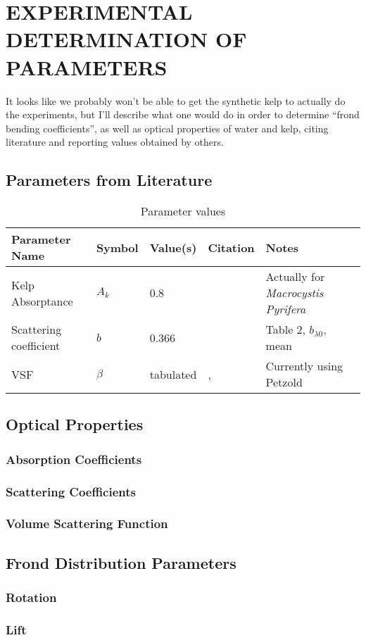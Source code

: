 \chapter{EXPERIMENTAL DETERMINATION OF PARAMETERS} \label{ch:experiment}

It looks like we probably won't be able to get the synthetic kelp to actually do
the experiments, but I'll describe what one would do in order to determine
``frond bending coefficients'', as well as optical properties of water and kelp,
citing literature and reporting values obtained by others.


\section{Parameters from Literature}
\begin{table}
  \caption{Parameter values}
  \centering
  \begin{tabular}{p{} p{} p{} p{} p{}}
    \toprule
    Parameter Name & Symbol & Value(s) & Citation & Notes \\
    \midrule
    Kelp Absorptance & $A_k$ & 0.8 & \cite{colombo-pallotta_photosynthetic_2006} & Actually for \textit{Macrocystis Pyrifera}\\
    Scattering coefficient & $b$ & 0.366 & \cite{sokolov_parameterization_2010} & Table 2, $b_{\lambda 0}$, mean \\
    VSF & $\beta$ & tabulated & \cite{petzold_volume_1972,sokolov_parameterization_2010}, & Currently using Petzold\\ 
    \bottomrule
  \end{tabular}
\end{table}


\section{Optical Properties}
\subsection{Absorption Coefficients}
\subsection{Scattering Coefficients}
\subsection{Volume Scattering Function}

\section{Frond Distribution Parameters}
\subsection{Rotation}
\subsection{Lift}
